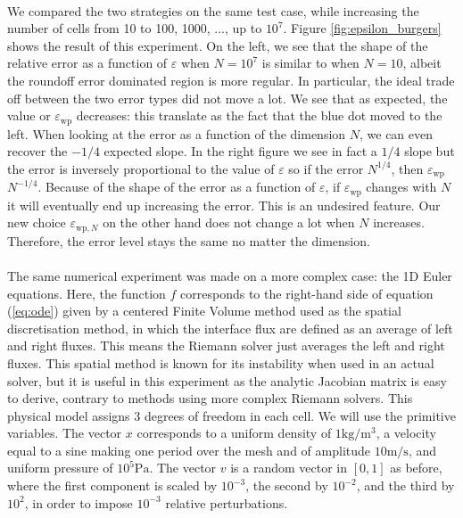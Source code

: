      \paragraph{}
      We compared the two strategies on the same test case, while increasing the number of cells from 10 to 100, 1000, ..., up to $10^7$.
      Figure \ref{fig:epsilon_burgers} shows the result of this experiment.
      On the left, we see that the shape of the relative error as a function of $\varepsilon$ when $N = 10^7$ is similar to when $N = 10$, albeit the roundoff error dominated region is more regular.
      In particular, the ideal trade off between the two error types did not move a lot.
      We see that as expected, the value or $\varepsilon_\textrm{wp}$ decreases: this translate as the fact that the blue dot moved to the left.
      When looking at the error as a function of the dimension $N$, we can even recover the $-1/4$ expected slope.
      In the right figure we see in fact a $1/4$ slope but the error is inversely proportional to the value of $\varepsilon$ so if the error  $N^{1/4}$, then $\varepsilon_\textrm{wp}$  $N^{-1/4}$.
      Because of the shape of the error as a function of $\varepsilon$, if $\varepsilon_\textrm{wp}$ changes with $N$ it will eventually end up increasing the error.
      This is an undesired feature.
      Our new choice $\varepsilon_{\textrm{wp}, N}$ on the other hand does not change a lot when $N$ increases.
      Therefore, the error level stays the same no matter the dimension.

      \paragraph{}
      The same numerical experiment was made on a more complex case: the 1D Euler equations.
      Here, the function $f$ corresponds to the right-hand side of equation (\ref{eq:ode}) given by a centered Finite Volume method used as the spatial discretisation method, in which the interface flux are defined as an average of left and right fluxes.
      This means the Riemann solver just averages the left and right fluxes.
      This spatial method is known for its instability when used in an actual solver, but it is useful in this experiment as the analytic Jacobian matrix is easy to derive, contrary to methods using more complex Riemann solvers.
      This physical model assigns 3 degrees of freedom in each cell.
      We will use the primitive variables.
      The vector $x$ corresponds to a uniform density of $1\si{\kilogram\per\cubic\meter}$, a velocity equal to a sine making one period over the mesh and of amplitude $10\si{\meter\per\second}$, and uniform pressure of $10^5\si{\pascal}$.
      The vector $v$ is a random vector in $\left[0, 1\right]$ as before, where the first component is scaled by $10^{-3}$, the second by $10^{-2}$, and the third by $10^{2}$, in order to impose $10^{-3}$ relative perturbations.

